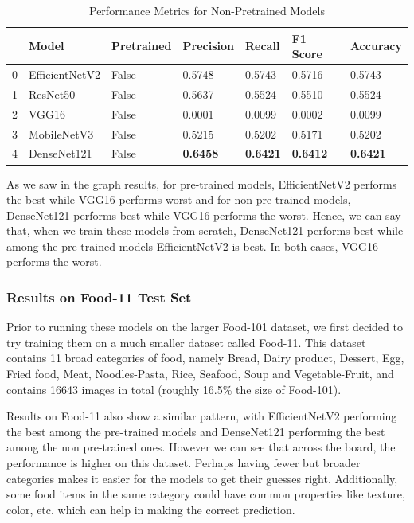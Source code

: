 \documentclass{article}
\begin{document}
\begin{table}[!ht]
    \centering
    \caption{Performance Metrics for Non-Pretrained Models}
    \begin{tabular}{|l|l|l|l|l|l|l|}
    \hline
        \textbf{} & \textbf{Model} & \textbf{Pretrained} & \textbf{Precision} & \textbf{Recall} & \textbf{F1 Score} & \textbf{Accuracy} \\ \hline
        0 & EfficientNetV2 & False & 0.5748 & 0.5743 & 0.5716 & 0.5743 \\ \hline
        1 & ResNet50 & False & 0.5637 & 0.5524 & 0.5510 & 0.5524 \\ \hline
        2 & VGG16 & False & 0.0001 & 0.0099 & 0.0002 & 0.0099 \\ \hline
        3 & MobileNetV3 & False & 0.5215 & 0.5202 & 0.5171 & 0.5202 \\ \hline
        4 & DenseNet121 & False & \textbf{0.6458} & \textbf{0.6421} & \textbf{0.6412} & \textbf{0.6421} \\ \hline
    \end{tabular}
\end{table}

As we saw in the graph results, for pre-trained models, EfficientNetV2 performs the best while VGG16 performs worst and for non pre-trained models, DenseNet121 performs best while VGG16 performs the worst. Hence, we can say that, when we train these models from scratch, DenseNet121 performs best while among the pre-trained models EfficientNetV2 is best. In both cases, VGG16 performs the worst.

\subsubsection*{Results on Food-11 Test Set}

Prior to running these models on the larger Food-101 dataset, we first decided to try training them on a much smaller dataset called Food-11. This dataset contains 11 broad categories of food, namely Bread, Dairy product, Dessert, Egg, Fried food, Meat, Noodles-Pasta, Rice, Seafood, Soup and Vegetable-Fruit, and contains 16643 images in total (roughly 16.5\% the size of Food-101).

Results on Food-11 also show a similar pattern, with EfficientNetV2 performing the best among the pre-trained models and DenseNet121 performing the best among the non pre-trained ones. However we can see that across the board, the performance is higher on this dataset. Perhaps having fewer but broader categories makes it easier for the models to get their guesses right. Additionally, some food items in the same category could have common properties like texture, color, etc. which can help in making the correct prediction.
\end{document}
